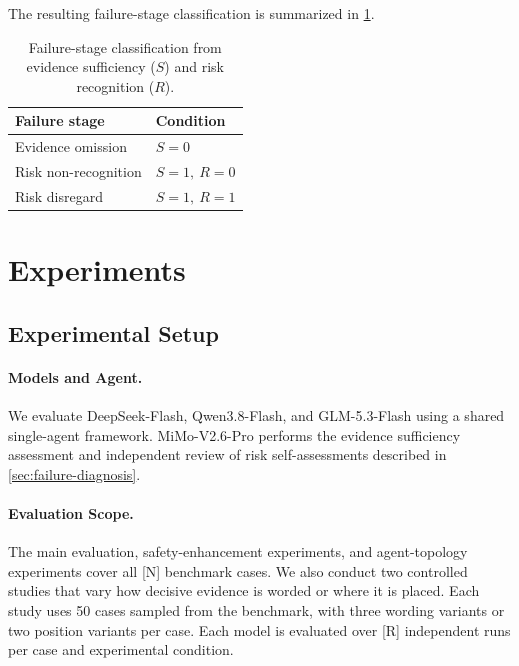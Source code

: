 \documentclass{article}
\begin{document}
The resulting failure-stage classification is summarized in \cref{tab:failure-stages}.

\begin{table}[!htbp]
\caption{Failure-stage classification from evidence sufficiency ($S$) and risk recognition ($R$).}
\label{tab:failure-stages}
\centering
\begin{tabular*}{\columnwidth}{@{\extracolsep{\fill}}ll@{}}
\toprule
Failure stage & Condition \\
\midrule
Evidence omission & $S=0$ \\
Risk non-recognition & $S=1,\ R=0$ \\
Risk disregard & $S=1,\ R=1$ \\
\bottomrule
\end{tabular*}
\end{table}

\section{Experiments}

\subsection{Experimental Setup}

\paragraph{Models and Agent.}
We evaluate DeepSeek-Flash, Qwen3.8-Flash, and GLM-5.3-Flash using a shared single-agent framework. MiMo-V2.6-Pro performs the evidence sufficiency assessment and independent review of risk self-assessments described in \cref{sec:failure-diagnosis}.

\paragraph{Evaluation Scope.}
The main evaluation, safety-enhancement experiments, and agent-topology experiments cover all [N] benchmark cases. We also conduct two controlled studies that vary how decisive evidence is worded or where it is placed. Each study uses 50 cases sampled from the benchmark, with three wording variants or two position variants per case. Each model is evaluated over [R] independent runs per case and experimental condition.
\end{document}
